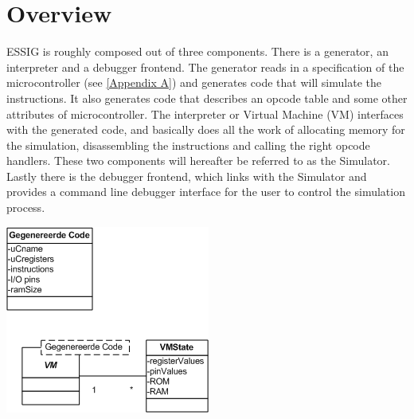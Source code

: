 \chapter{Overview}
\ac{ESSIG} is roughly composed out of three components. There is a generator,
an interpreter and a debugger frontend. The generator reads in a specification
of the microcontroller (see \ref{Appendix A}) and generates code that will
simulate the instructions. It also generates code that describes an opcode 
table and some other attributes of microcontroller.
The interpreter or Virtual Machine (VM) interfaces with the generated code,
and basically does all the work of allocating memory for the simulation,
disassembling the instructions and calling the right opcode handlers. These
two components will hereafter be referred to as the Simulator. Lastly
there is the debugger frontend, which links with the Simulator and provides a
command line debugger interface for the user to control the simulation
process.

\begin{center}
\includegraphics{diagrams/Model.png}
\end{center}
